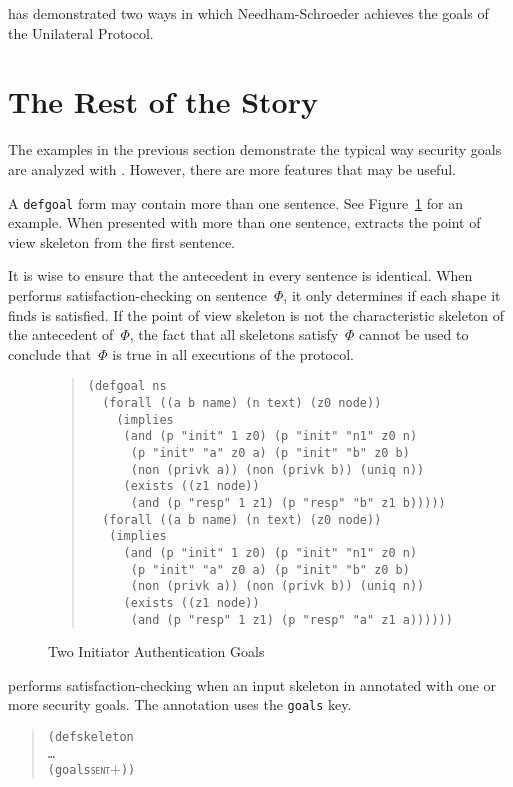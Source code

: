 \documentclass[12pt]{article}
\begin{document}
{\cpsa} has demonstrated two ways in which Needham-Schroeder achieves
the goals of the Unilateral Protocol.

\section{The Rest of the Story}\label{sec:whole story}

The examples in the previous section demonstrate the typical way
security goals are analyzed with {\cpsa}.  However, there are more
features that may be useful.

A \texttt{defgoal} form may contain more than one sentence.  See
Figure~\ref{fig:ns init goals} for an example.  When presented with
more than one sentence, {\cpsa} extracts the point of view skeleton
from the first sentence.

It is wise to ensure that the antecedent in every sentence is
identical.  When {\cpsa} performs satisfaction-checking on
sentence~$\Phi$, it only determines if each shape it finds is
satisfied.  If the point of view skeleton is not the characteristic
skeleton of the antecedent of~$\Phi$, the fact that all skeletons
satisfy~$\Phi$ cannot be used to conclude that~$\Phi$ is true in all
executions of the protocol.

\begin{figure}
\begin{quote}
\begin{verbatim}
(defgoal ns
  (forall ((a b name) (n text) (z0 node))
    (implies
     (and (p "init" 1 z0) (p "init" "n1" z0 n)
      (p "init" "a" z0 a) (p "init" "b" z0 b)
      (non (privk a)) (non (privk b)) (uniq n))
     (exists ((z1 node))
      (and (p "resp" 1 z1) (p "resp" "b" z1 b)))))
  (forall ((a b name) (n text) (z0 node))
   (implies
     (and (p "init" 1 z0) (p "init" "n1" z0 n)
      (p "init" "a" z0 a) (p "init" "b" z0 b)
      (non (privk a)) (non (privk b)) (uniq n))
     (exists ((z1 node))
      (and (p "resp" 1 z1) (p "resp" "a" z1 a))))))
\end{verbatim}
\end{quote}
\caption{Two Initiator Authentication Goals}\label{fig:ns init goals}
\end{figure}

{\cpsa} performs satisfaction-checking when an input skeleton in annotated
with one or more security goals.  The annotation uses the
\texttt{goals} key.

\begin{quote}
  \begin{alltt}
(defskeleton
   \ldots
   (goals \textsc{sent\ensuremath{+}}))
  \end{alltt}
\end{quote}
\end{document}
